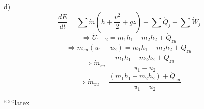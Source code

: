 d) \\
  
\]
\[
\frac{dE}{dt} = \sum \dot{m} \left( h + \frac{v^2}{2} + gz \right) + \sum \dot{Q}_j - \sum \dot{W}_j
\]
\[
\Rightarrow \dot{U}_{1-2} = m_1 h_1 - m_2 h_2 + \dot{Q}_{zu}
\]
\[
\Rightarrow \dot{m}_{zu} (u_1 - u_2) = m_1 h_1 - m_2 h_2 + \dot{Q}_{zu}
\]
\[
\Rightarrow \dot{m}_{zu} = \frac{m_1 h_1 - m_2 h_2 + \dot{Q}_{zu}}{u_1 - u_2}
\]
\[
\Rightarrow \dot{m}_{zu} = \frac{(m_1 h_1 - m_2 h_2) + \dot{Q}_{zu}}{u_1 - u_2}
\]

``````latex